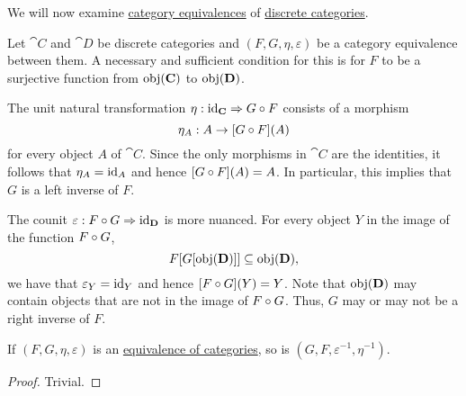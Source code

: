 \begin{remark}\label{ex:discrete_category_equivalence}
  We will now examine \hyperref[def:category_equivalence]{category equivalences} of \hyperref[ex:discrete_category]{discrete categories}.

  Let \( \cat{C} \) and \( \cat{D} \) be discrete categories and \( (F, G, \eta, \varepsilon) \) be a category equivalence between them. A necessary and sufficient condition for this is for \( F \) to be a surjective function from \( \operatorname{obj}(\operatorname{\mathbf{C}}) \) to \( \operatorname{obj}(\operatorname{\mathbf{D}}) \).

  The unit natural transformation \( \eta: \id_{\cat{C}} \Rightarrow G \bincirc F \) consists of a morphism
  \begin{equation*}
    \eta_A: A \to [G \bincirc F](A)
  \end{equation*}
  for every object \( A \) of \( \cat{C} \). Since the only morphisms in \( \cat{C} \) are the identities, it follows that \( \eta_A = \operatorname{id}_A \) and hence \( [G \bincirc F](A) = A \). In particular, this implies that \( G \) is a left inverse of \( F \).

  The counit \( \varepsilon: F \bincirc G \Rightarrow \id_{\cat{D}} \) is more nuanced. For every object \( Y \) in the image of the function \( F \bincirc G \),
  \begin{equation*}
    F[G[\operatorname{obj}(\operatorname{\mathbf{D}})]] \subseteq \operatorname{obj}(\operatorname{\mathbf{D}}),
  \end{equation*}
  we have that \( \varepsilon_Y = \operatorname{id}_Y \) and hence \( [F \bincirc G](Y) = Y \). Note that \( \operatorname{obj}(\operatorname{\mathbf{D}}) \) may contain objects that are not in the image of \( F \bincirc G \). Thus, \( G \) may or may not be a right inverse of \( F \).
\end{remark}

\begin{proposition}\label{thm:inverse_of_category_equivalence}
  If \( (F, G, \eta, \varepsilon) \) is an \hyperref[def:category_equivalence]{equivalence of categories}, so is \( (G, F, \varepsilon^{-1}, \eta^{-1}) \).
\end{proposition}
\begin{proof}
  Trivial.
\end{proof}

